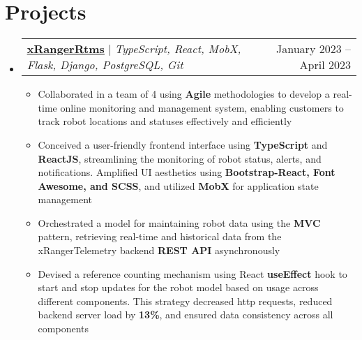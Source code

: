 \documentclass[letterpaper,11pt]{article}
\makeatletter
\newcommand{\resumeItem}[1]{
  \item\small{
    {#1 \vspace{-2pt}}
  }
}
\newcommand{\resumeProjectHeading}[2]{
    \item
    \begin{tabular*}{0.97\textwidth}{l@{\extracolsep{\fill}}r}
      \small#1 & #2 \\
    \end{tabular*}\vspace{-7pt}
}
\newcommand{\resumeSubHeadingListStart}{\begin{itemize}[leftmargin=0.15in, label={}]}
\newcommand{\resumeSubHeadingListEnd}{\end{itemize}}
\newcommand{\resumeItemListStart}{\begin{itemize}}
\newcommand{\resumeItemListEnd}{\end{itemize}\vspace{-5pt}}
\makeatother
\begin{document}
\section{Projects}
    \resumeSubHeadingListStart
      \resumeProjectHeading
          {\textbf{\underline{\href{https://github.com/xRanger-RTMS}{xRangerRtms}}} $|$ \emph{TypeScript, React, MobX, Flask, Django, PostgreSQL, Git}}{January 2023 -- April 2023}
          \resumeItemListStart
            \resumeItem{Collaborated in a team of 4 using \textbf{Agile} methodologies to develop a real-time online monitoring and management system, enabling customers to track robot locations and statuses effectively and efficiently}
            \resumeItem{Conceived a user-friendly frontend interface using \textbf{TypeScript} and \textbf{ReactJS}, streamlining the monitoring of robot status, alerts, and notifications. Amplified UI aesthetics using \textbf{Bootstrap-React, Font Awesome, and SCSS}, and utilized \textbf{MobX} for application state management}
            \resumeItem{Orchestrated a model for maintaining robot data using the \textbf{MVC} pattern, retrieving real-time and historical data from the xRangerTelemetry backend \textbf{REST API} asynchronously}
            \resumeItem{Devised a reference counting mechanism using React \textbf{useEffect} hook to start and stop updates for the robot model based on usage across different components. This strategy decreased http requests, reduced backend server load by \textbf{13\%}, and ensured data consistency across all components}
          \resumeItemListEnd
    \resumeSubHeadingListEnd


\end{document}
